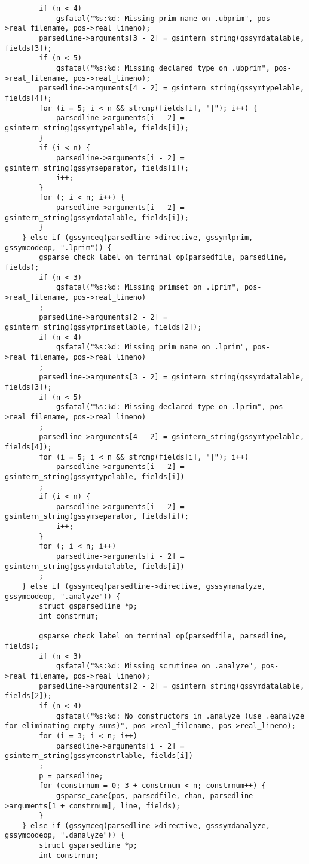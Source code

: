 \documentclass{report}
\begin{document}
\begin{verbatim}
        if (n < 4)
            gsfatal("%s:%d: Missing prim name on .ubprim", pos->real_filename, pos->real_lineno);
        parsedline->arguments[3 - 2] = gsintern_string(gssymdatalable, fields[3]);
        if (n < 5)
            gsfatal("%s:%d: Missing declared type on .ubprim", pos->real_filename, pos->real_lineno);
        parsedline->arguments[4 - 2] = gsintern_string(gssymtypelable, fields[4]);
        for (i = 5; i < n && strcmp(fields[i], "|"); i++) {
            parsedline->arguments[i - 2] = gsintern_string(gssymtypelable, fields[i]);
        }
        if (i < n) {
            parsedline->arguments[i - 2] = gsintern_string(gssymseparator, fields[i]);
            i++;
        }
        for (; i < n; i++) {
            parsedline->arguments[i - 2] = gsintern_string(gssymdatalable, fields[i]);
        }
    } else if (gssymceq(parsedline->directive, gssymlprim, gssymcodeop, ".lprim")) {
        gsparse_check_label_on_terminal_op(parsedfile, parsedline, fields);
        if (n < 3)
            gsfatal("%s:%d: Missing primset on .lprim", pos->real_filename, pos->real_lineno)
        ;
        parsedline->arguments[2 - 2] = gsintern_string(gssymprimsetlable, fields[2]);
        if (n < 4)
            gsfatal("%s:%d: Missing prim name on .lprim", pos->real_filename, pos->real_lineno)
        ;
        parsedline->arguments[3 - 2] = gsintern_string(gssymdatalable, fields[3]);
        if (n < 5)
            gsfatal("%s:%d: Missing declared type on .lprim", pos->real_filename, pos->real_lineno)
        ;
        parsedline->arguments[4 - 2] = gsintern_string(gssymtypelable, fields[4]);
        for (i = 5; i < n && strcmp(fields[i], "|"); i++)
            parsedline->arguments[i - 2] = gsintern_string(gssymtypelable, fields[i])
        ;
        if (i < n) {
            parsedline->arguments[i - 2] = gsintern_string(gssymseparator, fields[i]);
            i++;
        }
        for (; i < n; i++)
            parsedline->arguments[i - 2] = gsintern_string(gssymdatalable, fields[i])
        ;
    } else if (gssymceq(parsedline->directive, gsssymanalyze, gssymcodeop, ".analyze")) {
        struct gsparsedline *p;
        int constrnum;

        gsparse_check_label_on_terminal_op(parsedfile, parsedline, fields);
        if (n < 3)
            gsfatal("%s:%d: Missing scrutinee on .analyze", pos->real_filename, pos->real_lineno);
        parsedline->arguments[2 - 2] = gsintern_string(gssymdatalable, fields[2]);
        if (n < 4)
            gsfatal("%s:%d: No constructors in .analyze (use .eanalyze for eliminating empty sums)", pos->real_filename, pos->real_lineno);
        for (i = 3; i < n; i++)
            parsedline->arguments[i - 2] = gsintern_string(gssymconstrlable, fields[i])
        ;
        p = parsedline;
        for (constrnum = 0; 3 + constrnum < n; constrnum++) {
            gsparse_case(pos, parsedfile, chan, parsedline->arguments[1 + constrnum], line, fields);
        }
    } else if (gssymceq(parsedline->directive, gsssymdanalyze, gssymcodeop, ".danalyze")) {
        struct gsparsedline *p;
        int constrnum;


\end{verbatim}
\end{document}
